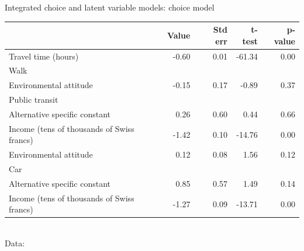 \begin{frame}{Integrated choice and latent variable models: choice model}
  \small
  \centering\begin{tabular}{lrrrr}
    \toprule
    {} &  Value &  Std err &  t-test &  p-value \\
    \midrule
    \hspace*{1em} Travel time (hours)     &  -0.60 &     0.01 &  -61.34 &     0.00 \\
    \hspace*{1em} Walk \\
    \hspace*{1.5em} Environmental attitude&  -0.15 &     0.17 &   -0.89 &     0.37 \\
    \hspace*{1em} Public transit \\
    \hspace*{1.5em} Alternative specific constant &   0.26 &     0.60 &    0.44 &     0.66 \\
    \hspace*{1.5em} Income (tens of thousands of Swiss francs) & -1.42 &     0.10 &  -14.76 &     0.00 \\
    \hspace*{1.5em} Environmental attitude &   0.12 &     0.08 &    1.56 &     0.12 \\
    \hspace*{1em} Car \\
    \hspace*{1.5em} Alternative specific constant &   0.85 &     0.57 &    1.49 &     0.14 \\
    \hspace*{1.5em} Income (tens of thousands of Swiss francs) &  -1.27 &     0.09 &  -13.71 &     0.00 \\
    \bottomrule
  \end{tabular}\\
  \tiny Data: \textcite{bierlaire_mode_2018}
\end{frame}

